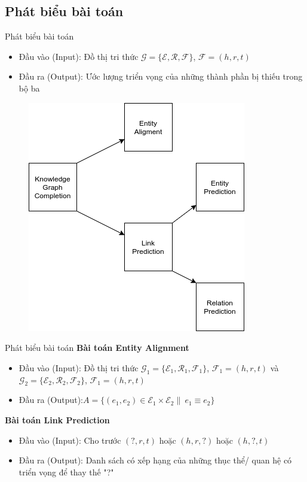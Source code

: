 \documentclass[notheorems, aspectratio=54]{beamer}
\begin{document}
	\subsection{Phát biểu bài toán}
	\begin{frame}{Phát biểu bài toán}
		\begin{itemize}
			\item Đầu vào (Input): Đồ thị tri thức $\mathcal{G} = \{\mathcal{E}, \mathcal{R}, \mathcal{F}\}$, $\mathcal{F} = (h, r, t)$
			\item Đầu ra (Output): Ước lượng triển vọng của những thành phần bị thiếu trong bộ ba
		\end{itemize}
	\begin{figure}[H]
		\includegraphics[width=0.5\linewidth]{figs/problem_divided.png}
		\label{fig:writing-thesis}
	\end{figure}
	\end{frame}
	\begin{frame}{Phát biểu bài toán}
		\textbf{Bài toán Entity Alignment}
		\begin{itemize}
			\item Đầu vào (Input): Đồ thị tri thức $\mathcal{G}_1 = \{\mathcal{E}_1, \mathcal{R}_1, \mathcal{F}_1\}$, $\mathcal{F}_1 = (h, r, t)$ và  $\mathcal{G}_2 = \{\mathcal{E}_2, \mathcal{R}_2, \mathcal{F}_2\}$, $\mathcal{F}_1 = (h, r, t)$
			\item Đầu ra (Output):$A = \{(e_1, e_2) \in \mathcal{E}_1 \times \mathcal{E}_2 \|\ e_1 \equiv e_2\}$
		\end{itemize}
		\textbf{Bài toán Link Prediction}
		\begin{itemize}
			\item Đầu vào (Input): Cho trước $(?, r, t)$ hoặc $(h, r, ?)$ hoặc $(h, ?, t)$
			\item Đầu ra (Output): Danh sách có xếp hạng của những thục thể/ quan hệ có triển vọng để thay thế "?"
		\end{itemize}
	\end{frame}
\end{document}
